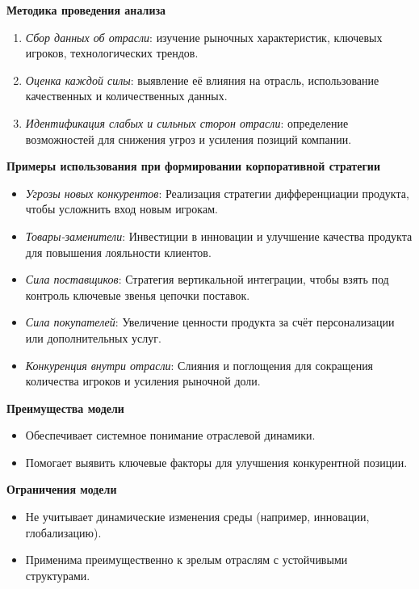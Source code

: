 \textbf{Методика проведения анализа}
\begin{enumerate}
    \item \textit{Сбор данных об отрасли}: изучение рыночных характеристик, ключевых игроков, технологических трендов.
    \item \textit{Оценка каждой силы}: выявление её влияния на отрасль, использование качественных и количественных данных.
    \item \textit{Идентификация слабых и сильных сторон отрасли}: определение возможностей для снижения угроз и усиления позиций компании.
\end{enumerate}

\textbf{Примеры использования при формировании корпоративной стратегии}
\begin{itemize}
    \item \textit{Угрозы новых конкурентов}: 
    Реализация стратегии дифференциации продукта, чтобы усложнить вход новым игрокам.
    \item \textit{Товары-заменители}: 
    Инвестиции в инновации и улучшение качества продукта для повышения лояльности клиентов.
    \item \textit{Сила поставщиков}: 
    Стратегия вертикальной интеграции, чтобы взять под контроль ключевые звенья цепочки поставок.
    \item \textit{Сила покупателей}: 
    Увеличение ценности продукта за счёт персонализации или дополнительных услуг.
    \item \textit{Конкуренция внутри отрасли}: 
    Слияния и поглощения для сокращения количества игроков и усиления рыночной доли.
\end{itemize}

\textbf{Преимущества модели}
\begin{itemize}
    \item Обеспечивает системное понимание отраслевой динамики.
    \item Помогает выявить ключевые факторы для улучшения конкурентной позиции.
\end{itemize}

\textbf{Ограничения модели}
\begin{itemize}
    \item Не учитывает динамические изменения среды (например, инновации, глобализацию).
    \item Применима преимущественно к зрелым отраслям с устойчивыми структурами.
\end{itemize}


